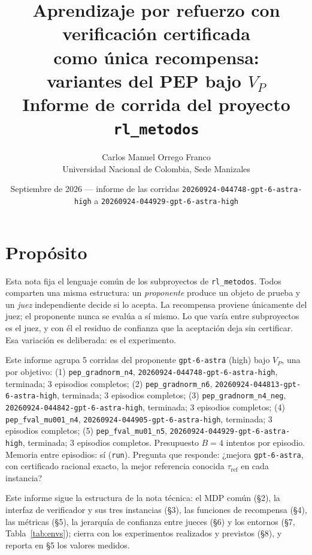\documentclass[11pt,a4paper]{article}
\title{Aprendizaje por refuerzo con verificación certificada\\como única recompensa:\\variantes del PEP bajo $V_P$\\[0.4em]\large Informe de corrida del proyecto \texttt{rl\_metodos}}
\author{Carlos Manuel Orrego Franco\\Universidad Nacional de Colombia, Sede Manizales}
\date{Septiembre de 2026 --- informe de las corridas \texttt{20260924-\allowbreak{}044748-\allowbreak{}gpt-\allowbreak{}6-\allowbreak{}astra-\allowbreak{}high} a \texttt{20260924-\allowbreak{}044929-\allowbreak{}gpt-\allowbreak{}6-\allowbreak{}astra-\allowbreak{}high}}
\begin{document}
\maketitle

\section{Propósito}

Esta nota fija el lenguaje común de los subproyectos de \texttt{rl\_metodos}. Todos comparten una misma estructura: un \emph{proponente} produce un objeto de prueba y un \emph{juez} independiente decide si lo acepta. La recompensa proviene únicamente del juez; el proponente nunca se evalúa a sí mismo. Lo que varía entre subproyectos es el juez, y con él el residuo de confianza que la aceptación deja sin certificar. Esa variación es deliberada: es el experimento.

Este informe agrupa 5 corridas del proponente \texttt{gpt-\allowbreak{}6-\allowbreak{}astra} (high) bajo $V_P$, una por objetivo: (1) \texttt{pep\_\allowbreak{}gradnorm\_\allowbreak{}n4}, \texttt{20260924-\allowbreak{}044748-\allowbreak{}gpt-\allowbreak{}6-\allowbreak{}astra-\allowbreak{}high}, terminada; 3 episodios completos; (2) \texttt{pep\_\allowbreak{}gradnorm\_\allowbreak{}n6}, \texttt{20260924-\allowbreak{}044813-\allowbreak{}gpt-\allowbreak{}6-\allowbreak{}astra-\allowbreak{}high}, terminada; 3 episodios completos; (3) \texttt{pep\_\allowbreak{}gradnorm\_\allowbreak{}n4\_\allowbreak{}neg}, \texttt{20260924-\allowbreak{}044842-\allowbreak{}gpt-\allowbreak{}6-\allowbreak{}astra-\allowbreak{}high}, terminada; 3 episodios completos; (4) \texttt{pep\_\allowbreak{}fval\_\allowbreak{}mu001\_\allowbreak{}n4}, \texttt{20260924-\allowbreak{}044905-\allowbreak{}gpt-\allowbreak{}6-\allowbreak{}astra-\allowbreak{}high}, terminada; 3 episodios completos; (5) \texttt{pep\_\allowbreak{}fval\_\allowbreak{}mu01\_\allowbreak{}n5}, \texttt{20260924-\allowbreak{}044929-\allowbreak{}gpt-\allowbreak{}6-\allowbreak{}astra-\allowbreak{}high}, terminada; 3 episodios completos. Presupuesto $B = 4$ intentos por episodio. Memoria entre episodios: sí (\texttt{run}). Pregunta que responde: ¿mejora \texttt{gpt-\allowbreak{}6-\allowbreak{}astra}, con certificado racional exacto, la mejor referencia conocida $\tau_{\mathrm{ref}}$ en cada instancia?

Este informe sigue la estructura de la nota técnica: el MDP común (§2), la interfaz de verificador y sus tres instancias (§3), las funciones de recompensa (§4), las métricas (§5), la jerarquía de confianza entre jueces (§6) y los entornos (§7, Tabla~\ref{tab:envs}); cierra con los experimentos realizados y previstos (§8), y reporta en §5 los valores medidos.
\end{document}
